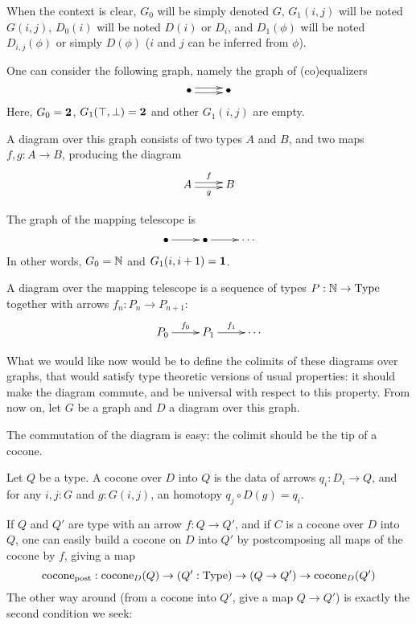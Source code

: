 When the context is clear, $G_0$ will be simply denoted $G$,
$G_1(i,j)$ will be noted $G(i,j)$, $D_0(i)$
will be noted $D(i)$ or $D_i$, and $D_1(\phi)$ will be noted
$D_{i,j}(\phi)$ or simply $D(\phi)$ ($i$ and $j$ can be inferred from
$\phi$).

\begin{exms}
  \item One can consider the following graph, namely the graph of
    (co)equalizers
    \[ \xymatrix{\bullet \ar@<-.5ex>[r] \ar@<.5ex>[r] & \bullet} \]
    Here, $G_0 = \mathbf{2}$, $G_1(\top,\bot) = \mathbf{2}$ and other
    $G_1(i,j)$ are empty.

    A diagram over this graph consists of two types $A$ and $B$, and
    two maps $f,g:A \to B$, producing the diagram
    \[ \xymatrix{A \ar@<-.5ex>[r]_g \ar@<.5ex>[r]^f & B} \]
  \item The graph of the mapping telescope is 
    \[ \xymatrix{ \bullet \ar[r] &\bullet \ar[r] &\cdots} \]
    In other words, $G_0=\mathbb{N}$ and $G_1(i,i+1) = \mathbf{1}$.

    A diagram over the mapping telescope is a sequence of types $P:\mathbb{N}
    \to \operatorname{Type}$ together with arrows $f_n:P_n \to P_{n+1}$:
    \[ \xymatrix{ P_0 \ar[r]^{f_0} & P_1 \ar[r]^{f_1} & \cdots} \]
\end{exms}

What we would like now would be to define the colimits of these
diagrams over graphs, that would satisfy type theoretic versions of
usual properties: it should make the diagram commute, and be universal
with respect to this property.
From now on, let $G$ be a graph and $D$ a diagram over this graph.

The commutation of the diagram is easy: the colimit should be the tip
of a cocone.

\begin{defi}[Cocone]\label{defi:cocone}
  Let $Q$ be a type. A cocone over $D$ into $Q$ is the data of arrows
  $q_i:D_i \to Q$, and for any $i,j:G$ and $g:G(i,j)$, an homotopy 
  $q_j \circ D(g) = q_i$.
\end{defi}

If $Q$ and $Q'$ are type with an arrow $f:Q\to Q'$, and if $C$ is a
cocone over $D$ into $Q$, one can easily build a cocone on $D$ into
$Q'$ by postcomposing all maps of the cocone by $f$, giving a map
\newcommand{\postcomposecocone}{\mathrm{cocone}_{\mathrm{post}}}
\newcommand{\precomposecocone}{\mathrm{cocone}_{\mathrm{pre}}}
\[\postcomposecocone : \cocone_D(Q) \to (Q':\Type) \to (Q \to Q') \to \cocone_D(Q') \]
The other way around (from a cocone into $Q'$, give a map $Q\to Q'$)
is exactly the second condition we seek:

